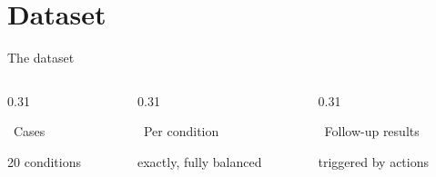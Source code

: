 \documentclass[aspectratio=169,t]{beamer}
\begin{document}
\section{Dataset}

\begin{frame}{The dataset}
  \begin{columns}[T,onlytextwidth]
    \begin{column}{0.31\textwidth}
      \begin{block}{\faLayerGroup\;\, Cases}
        \centering

        \vspace{0.3mm}
        {\footnotesize 20 conditions}
      \end{block}
    \end{column}%
    \hfill
    \begin{column}{0.31\textwidth}
      \begin{alertblock}{\faBalanceScale\;\, Per condition}
        \centering

        \vspace{0.3mm}
        {\footnotesize exactly, fully balanced}
      \end{alertblock}
    \end{column}%
    \hfill
    \begin{column}{0.31\textwidth}
      \begin{exampleblock}{\faDatabase\;\, Follow-up results}
        \centering

        \vspace{0.3mm}
        {\footnotesize triggered by actions}
      \end{exampleblock}
    \end{column}
  \end{columns}


\end{frame}
\end{document}
